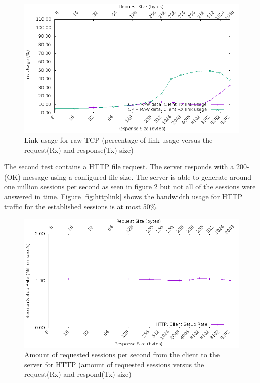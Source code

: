 \begin{figure}[H]
  \includegraphics[scale=0.6]{images/raw_link_usage.png}
  \caption{Link usage for raw TCP (percentage of link usage versus the request(Rx) and response(Tx) size)}
  \label{fig:rawtcplink}
\end{figure}

The second test contains a HTTP file request. The server responds with a 200-(OK) message using a configured file size.
The server is able to generate around one million sessions per second as seen in figure \ref{fig:httpsession} but not all of the sessions were answered in time.
Figure \ref{fig:httplink} shows the bandwidth usage for HTTP traffic for the established sessions is at most 50\%. 


\begin{figure}[H]
  \includegraphics[scale=0.6]{images/http_setup.png}
  \caption{Amount of requested sessions per second from the client to the server for HTTP (amount of requested sessions versus the request(Rx) and respond(Tx) size)}
  \label{fig:httpsession}
\end{figure}

